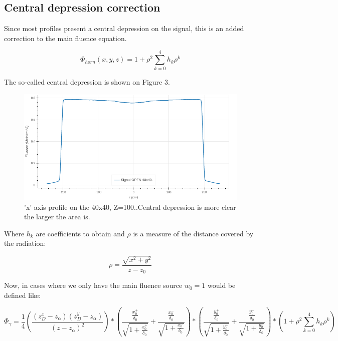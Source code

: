 \documentclass[openany]{article}
\begin{document}
\subsection{Central depression correction}

Since most profiles present a central depression on the signal, this is an added correction to the main fluence equation.

\begin{equation}
    \Phi_{horn}(x,y,z) = 1+ \rho^2 \sum_{k=0}^4 h_k \rho^k
    
\end{equation}

The so-called central depression is shown on Figure 3.

\begin{figure}[!h]
    \centering
    \includegraphics[width=\textwidth]{Central_Depression.png}
    \caption{'x' axis profile on the 40x40, Z=100..Central depression is more clear the larger the area is.}
    \label{fig:my_label}
\end{figure}

Where \(h_k\) are coefficients to obtain and \(\rho\) is a measure of the distance covered by the radiation:

\begin{equation}
    \rho = \frac{\sqrt{x^2 + y^2}}{z-z_0}
\end{equation}




Now, in cases where we only have the main fluence source \(w_0 = 1\) would be defined like:

\begin{equation}
    \Phi_\gamma = \frac{1}{4} (\frac{(z_D^x - z_\alpha) (z^y_D - z_\alpha )}{(z-z_\alpha)^2})*(\frac{\frac{x_0^+}{\delta_0}}{\sqrt{1+\frac{x_0^+}{\delta_0}}} + \frac{\frac{x_0^-}{\delta_0}}{\sqrt{1+\frac{x_0^-}{\delta_0}}}) * (\frac{\frac{y_0^+}{\delta_0}}{\sqrt{1+\frac{y_0^+}{\delta_0}}} + \frac{\frac{y_0^-}{\delta_0}}{\sqrt{1+\frac{y_0^-}{\delta_0}}}) * ( 1+ \rho^2 \sum_{k=0}^4 h_k \rho^k)
\end{equation}
\end{document}
